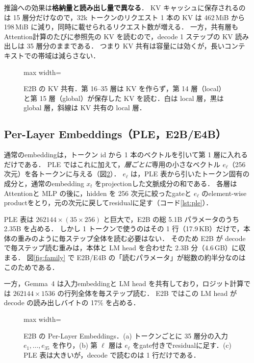 \documentclass[a4paper,10pt]{ltjsarticle}
\begin{document}
推論への効果は\textbf{格納量と読み出し量で異なる}．
KV キャッシュに保存されるのは 15 層分だけなので，32k トークンのリクエスト 1 本の KV は 462\,MiB から 198\,MiB に減り，同時に載せられるリクエスト数が増える．
一方，共有層もAttention計算のたびに参照先の KV を読むので，decode 1 ステップの KV 読み出しは 35 層分のままである．
つまり KV 共有は容量には効くが，長いコンテキストでの帯域は減らさない．

\begin{figure}[htbp]\centering
\begin{adjustbox}{max width=\linewidth}\end{adjustbox}
\caption{E2B の KV 共有．第 16--35 層は KV を作らず，第 14 層（local）と第 15 層（global）が保存した KV を読む．白は local 層，黒は global 層，斜線は KV 共有の local 層．}
\label{fig:kvshare}
\end{figure}



\subsection{Per-Layer Embeddings（PLE，E2B/E4B）}
通常のembeddingは，トークン id から 1 本のベクトルを引いて第 1 層に入れるだけである．
PLE ではこれに加えて，\emph{層ごとに}専用の小さなベクトル $e_\ell$（256 次元）を各トークンに与える（図\ref{fig:ple}）．
$e_\ell$ は，PLE 表から引いたトークン固有の成分と，通常のembedding $x_t$ をprojectionした文脈成分の和である．
各層はAttentionと MLP の後に，hidden を 256 次元に絞ったgateと $e_\ell$ のelement-wise productをとり，元の次元に戻してresidualに足す（コード\ref{lst:ple}）．

PLE 表は $262144 \times (35 \times 256)$ と巨大で，E2B の総 5.1B パラメータのうち 2.35B を占める．
しかし 1 トークンで使うのはその 1 行（17.9\,KB）だけで，本体の重みのように毎ステップ全体を読む必要はない．
そのため E2B が decode で毎ステップ読む重みは，本体と LM head を合わせた 2.3B 分（4.6\,GB）に収まる．
図\ref{fig:family} で E2B/E4B の「読むパラメータ」が総数の約半分なのはこのためである．

一方，Gemma~4 は入力embeddingと LM head を共有しており，ロジット計算では $262144 \times 1536$ の行列全体を毎ステップ読む．
E2B ではこの LM head が decode の読み出しバイトの 17\% を占める．

\begin{figure}[htbp]\centering
\begin{adjustbox}{max width=\linewidth}\end{adjustbox}
\caption{E2B の Per-Layer Embeddings．(a) トークンごとに 35 層分の入力 $e_1, \dots, e_{35}$ を作り，(b) 第 $\ell$ 層は $e_\ell$ をgate付きでresidualに足す．(c) PLE 表は大きいが，decode で読むのは 1 行だけである．}
\label{fig:ple}
\end{figure}
\end{document}
